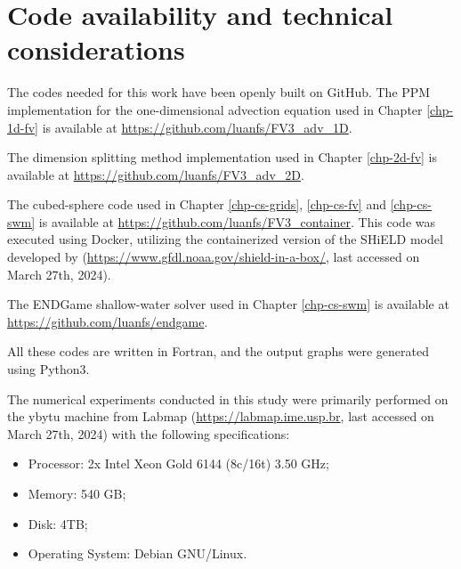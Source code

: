 \chapter{Code availability and technical considerations}
\label{anexo-code}
The codes needed for this work have been openly built on GitHub. 
The PPM implementation for the one-dimensional advection equation used in Chapter \ref{chp-1d-fv} is available at \url{https://github.com/luanfs/FV3_adv_1D}.

The dimension splitting method implementation used in Chapter \ref{chp-2d-fv} is available at \url{https://github.com/luanfs/FV3_adv_2D}.

The cubed-sphere code used in Chapter \ref{chp-cs-grids}, \ref{chp-cs-fv} and \ref{chp-cs-swm} is available at \url{https://github.com/luanfs/FV3_container}.
This code was executed using Docker, utilizing the containerized version of the SHiELD model developed by \citet{cheng:2022}
(\url{https://www.gfdl.noaa.gov/shield-in-a-box/}, last accessed on March 27th, 2024).

The ENDGame shallow-water solver used in Chapter \ref{chp-cs-swm}  is available at \url{https://github.com/luanfs/endgame}.

All these codes are written in Fortran, and the output graphs were generated using Python3.

The numerical experiments conducted in this study were primarily performed on the ybytu machine from Labmap 
(\url{https://labmap.ime.usp.br}, last accessed on March 27th, 2024) with the following specifications:
\begin{itemize}
	\item Processor: 2x Intel Xeon Gold 6144 (8c/16t) 3.50 GHz;
	\item Memory: 540 GB;
	\item Disk: 4TB;
	\item Operating System: Debian GNU/Linux.
\end{itemize}




